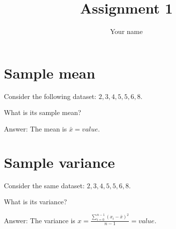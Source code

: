 \documentclass{article}
\title{Assignment 1}
\author{Your name}
\begin{document}
\maketitle


\section{Sample mean}
Consider the following dataset:
${2, 3, 4, 5, 5, 6, 8}$. 

What is its sample mean?

Answer: The mean is $\bar x=value$.

\newpage
\section{Sample variance}
Consider the same dataset:
${2, 3, 4, 5, 5, 6, 8}$. 

What is its variance?

Answer: The variance is $x=\frac{\sum_{i=0}^{n-1}{(x_i - \bar x)^2}}{n-1} = value $.
\end{document}
